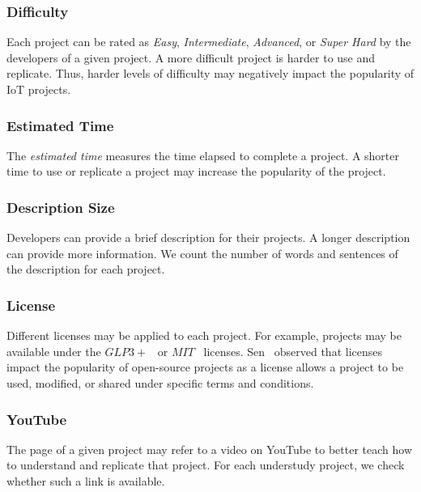 \subsubsection*{Difficulty} Each project can be rated as \textit{Easy}, \textit{Intermediate}, \textit{Advanced}, or \textit{Super Hard} by the developers of a given project.
A more difficult project is harder to use and replicate. Thus, harder levels of difficulty may negatively impact the popularity of IoT projects.

\subsubsection*{Estimated Time} The {\em estimated time} measures the time elapsed to complete a project.
A shorter time to use or replicate a project may increase the popularity of the project.



\subsubsection*{Description Size} Developers can provide a brief description for their projects. A longer description can provide more information. We count the number of words and sentences of the description for each project.

\subsubsection*{License} Different licenses may be applied to each project.
For example, projects may be available under the $GLP3+$~\cite{gpllicense} or $MIT$~\cite{open2006license} licenses.
Sen~\cite{sen2006open} observed that licenses impact the popularity of open-source projects as a license allows a project to be used, modified, or shared under specific terms and conditions.

\subsubsection*{YouTube} The page of a given project may refer to a video on YouTube to better teach how to understand and replicate that project. For each understudy project, we check whether such a link is available.

